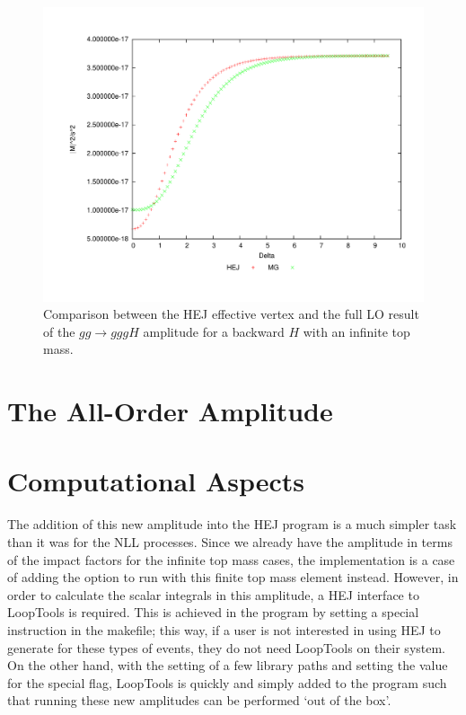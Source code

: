 \begin{figure}[H]
\centering
\includegraphics[scale=0.43]{Images/gg_nextback.pdf}
\caption{Comparison between the HEJ effective vertex and the full LO result of the $gg \to gggH$ amplitude for a backward $H$ with an infinite top mass.}
\label{fig:gg_ggh_4}
\end{figure}

\section{The All-Order Amplitude}
\section{Computational Aspects}

The addition of this new amplitude into the HEJ program is a much simpler task than it was for the NLL processes. Since we already have the amplitude in terms of the impact factors for the infinite top mass cases, the implementation is a case of adding the option to run with this finite top mass element instead. However, in order to calculate the scalar integrals in this amplitude, a HEJ interface to LoopTools is required. This is achieved in the program by setting a special instruction in the makefile; this way, if a user is not interested in using HEJ to generate for these types of events, they do not need LoopTools on their system. On the other hand, with the setting of a few library paths and setting the value for the special flag, LoopTools is quickly and simply added to the program such that running these new amplitudes can be performed `out of the box'. 

